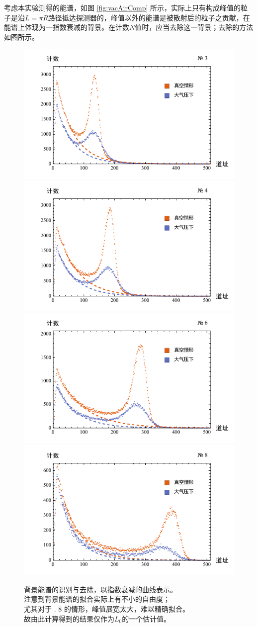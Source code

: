 \documentclass[aps,pre,12pt,preprint,%
	onecolumn,showpacs,showkeys,nofootinbib]{revtex4-1}
\begin{document}
	考虑本实验测得的能谱，如图 \ref{fig:vacAirComp} 所示，实际上只有构成峰值的粒子是沿$L = \pi R$路径抵达探测器的，峰值以外的能谱是被散射后的粒子之贡献，在能谱上体现为一指数衰减的背景。在计数$N$值时，应当去除这一背景；去除的方法如图所示。
	\begin{figure}[!h]
	\centering
	\centering
	\includegraphics[width=.48\linewidth]{plotBgRemoved3.pdf}
	\includegraphics[width=.48\linewidth]{plotBgRemoved4.pdf}
	\includegraphics[width=.48\linewidth]{plotBgRemoved6.pdf}
	\includegraphics[width=.48\linewidth]{plotBgRemoved8.pdf}
	\caption[背景除去]{背景能谱的识别与去除，以指数衰减的曲线表示。\\
		注意到背景能谱的拟合实际上有不小的自由度；\\
		尤其对于 \textnumero. 8 的情形，峰值展宽太大，难以精确拟合。\\
		故由此计算得到的结果仅作为$L_0$的一个估计值。}
	\label{fig:bgRemoved}
	\end{figure}
\pagebreak
	
\end{document}
